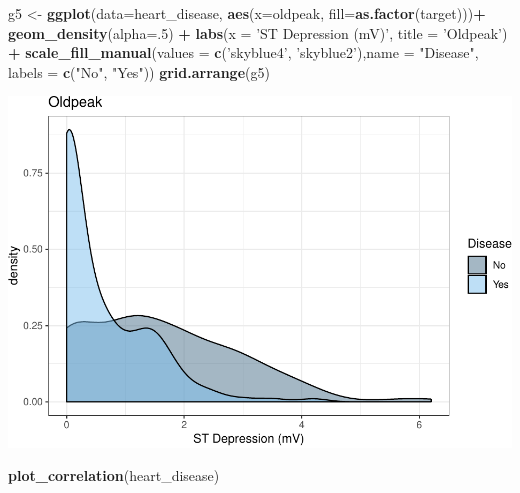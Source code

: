 \documentclass[]{article}
\newenvironment{Shaded}{\begin{snugshade}}{\end{snugshade}}
\newcommand{\KeywordTok}[1]{\textcolor[rgb]{0.13,0.29,0.53}{\textbf{#1}}}
\newcommand{\DataTypeTok}[1]{\textcolor[rgb]{0.13,0.29,0.53}{#1}}
\newcommand{\DecValTok}[1]{\textcolor[rgb]{0.00,0.00,0.81}{#1}}
\newcommand{\StringTok}[1]{\textcolor[rgb]{0.31,0.60,0.02}{#1}}
\newcommand{\OperatorTok}[1]{\textcolor[rgb]{0.81,0.36,0.00}{\textbf{#1}}}
\newcommand{\NormalTok}[1]{#1}
\begin{document}
\begin{Shaded}
\begin{Highlighting}[]
\NormalTok{g5 <-}\StringTok{ }\KeywordTok{ggplot}\NormalTok{(}\DataTypeTok{data=}\NormalTok{heart_disease, }\KeywordTok{aes}\NormalTok{(}\DataTypeTok{x=}\NormalTok{oldpeak, }\DataTypeTok{fill=}\KeywordTok{as.factor}\NormalTok{(target)))}\OperatorTok{+}
\StringTok{  }\KeywordTok{geom_density}\NormalTok{(}\DataTypeTok{alpha=}\NormalTok{.}\DecValTok{5}\NormalTok{) }\OperatorTok{+}
\StringTok{  }\KeywordTok{labs}\NormalTok{(}\DataTypeTok{x =} \StringTok{'ST Depression (mV)'}\NormalTok{, }\DataTypeTok{title =} \StringTok{'Oldpeak'}\NormalTok{) }\OperatorTok{+}
\StringTok{  }\KeywordTok{scale_fill_manual}\NormalTok{(}\DataTypeTok{values =} \KeywordTok{c}\NormalTok{(}\StringTok{'skyblue4'}\NormalTok{, }\StringTok{'skyblue2'}\NormalTok{),}\DataTypeTok{name =} \StringTok{"Disease"}\NormalTok{, }\DataTypeTok{labels =} \KeywordTok{c}\NormalTok{(}\StringTok{"No"}\NormalTok{, }\StringTok{"Yes"}\NormalTok{))}
\KeywordTok{grid.arrange}\NormalTok{(g5)}
\end{Highlighting}
\end{Shaded}

\includegraphics{project_report_files/figure-latex/unnamed-chunk-7-1.pdf}

\begin{Shaded}
\begin{Highlighting}[]
\KeywordTok{plot_correlation}\NormalTok{(heart_disease)}
\end{Highlighting}
\end{Shaded}
\end{document}

